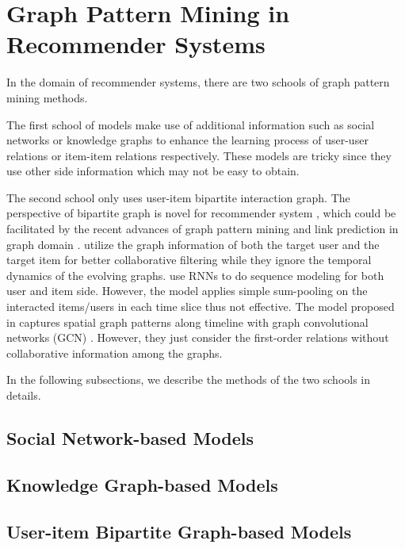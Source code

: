 \section{Graph Pattern Mining in Recommender Systems}
In the domain of recommender systems, there are two schools of graph pattern mining methods.

The first school of models make use of additional information such as social networks \cite{song2019session,wu2019dual} or knowledge graphs \cite{wang2018ripplenet} to enhance the learning process of user-user relations or item-item relations respectively. These models are tricky since they use other side information which may not be easy to obtain.

The second school only uses user-item bipartite interaction graph.
The perspective of bipartite graph is novel for recommender system \cite{fadel2018link}, which could be facilitated by the recent advances of graph pattern mining \cite{kipf2016semi} and link prediction in graph domain \cite{van2017graph}.
\cite{niu2018collaborative} utilize the graph information of both the target user and the target item for better collaborative filtering while they ignore the temporal dynamics of the evolving graphs.
\cite{wu2017recurrent} use RNNs to do sequence modeling for both user and item side. However, the model applies simple sum-pooling on the interacted items/users in each time slice thus not effective.
The model proposed in \cite{fadel2018link} captures spatial graph patterns along timeline with graph convolutional networks (GCN) \cite{van2017graph}. However, they just consider the first-order relations without collaborative information among the graphs.

In the following subsections, we describe the methods of the two schools in details.

\subsection{Social Network-based Models}
\subsection{Knowledge Graph-based Models}
\subsection{User-item Bipartite Graph-based Models}